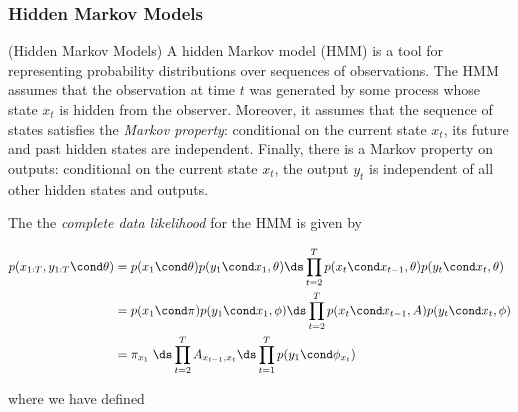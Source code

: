 \documentclass{article} %
\newcommand{\state}{x}
\begin{document}
\subsubsection{Hidden Markov Models} 

\begin{example}{(Hidden Markov Models)} 
A  hidden Markov model (HMM) is a tool for representing probability distributions over sequences of observations.  The HMM assumes that the observation at time $t$ was generated by some process whose state $\state_t$ is hidden from the observer.  Moreover, it assumes that the sequence of states satisfies the \textit{Markov property}:  conditional on the current state $\state_t$, its future and past hidden states are independent.  Finally, there is a Markov property on outputs:  conditional on the current state $\state_t$, the output $y_t$ is independent of all other hidden states and outputs.

%
%
 
The the \textit{complete data likelihood} for the HMM is given by

\begin{align}
 p(\state_{1:T}, y_{1:T} \cond \theta) &=  p(\state_1 \cond \theta)  p(y_1 \cond \state_1, \theta) \ds\prod_{t=2}^T p(\state_t \cond \state_{t-1}, \theta) p(y_t \cond \state_t, \theta) \nonumber \\
 &=  p(\state_1 \cond \pi) p(y_1 \cond \state_1, \phi) \ds\prod_{t=2}^T p(\state_t \cond \state_{t-1}, A) p(y_t \cond \state_t, \phi)   \nonumber \\
 &= \pi_{\state_1}  \; \ds\prod_{t=2}^T A_{\state_{t-1}, \state_t} \ds\prod_{t=1}^T p(y_1 \cond \phi_{\state_t}) \label{eqn:hmm_cdl_compact}
 \end{align}
 
where we have defined 


\end{example}
\end{document}
